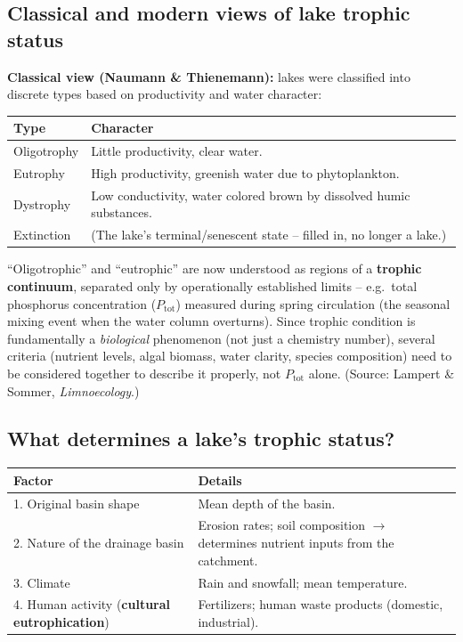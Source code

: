 \documentclass[11pt,a4paper]{article}
\begin{document}
\subsection{Classical and modern views of lake trophic status}
\textbf{Classical view (Naumann \& Thienemann):} lakes were classified into discrete types based on productivity and water character:
\begin{center}
\begin{tabularx}{\textwidth}{@{}l X@{}}
\toprule
\textbf{Type} & \textbf{Character} \\
\midrule
Oligotrophy & Little productivity, clear water. \\
Eutrophy & High productivity, greenish water due to phytoplankton. \\
Dystrophy & Low conductivity, water colored brown by dissolved humic substances. \\
Extinction & (The lake's terminal/senescent state -- filled in, no longer a lake.) \\
\bottomrule
\end{tabularx}
\end{center}

\begin{keybox}[title={Modern view: a continuum, not discrete boxes}]
``Oligotrophic'' and ``eutrophic'' are now understood as regions of a \textbf{trophic continuum}, separated only by operationally established limits -- e.g.\ total phosphorus concentration ($P_{\text{tot}}$) measured during spring circulation (the seasonal mixing event when the water column overturns). Since trophic condition is fundamentally a \emph{biological} phenomenon (not just a chemistry number), several criteria (nutrient levels, algal biomass, water clarity, species composition) need to be considered together to describe it properly, not $P_{\text{tot}}$ alone. (Source: Lampert \& Sommer, \textit{Limnoecology}.)
\end{keybox}

\subsection{What determines a lake's trophic status?}
\begin{center}
\begin{tabularx}{\textwidth}{@{}l X@{}}
\toprule
\textbf{Factor} & \textbf{Details} \\
\midrule
1. Original basin shape & Mean depth of the basin. \\
2. Nature of the drainage basin & Erosion rates; soil composition $\to$ determines nutrient inputs from the catchment. \\
3. Climate & Rain and snowfall; mean temperature. \\
4. Human activity (\textbf{cultural eutrophication}) & Fertilizers; human waste products (domestic, industrial). \\
\bottomrule
\end{tabularx}
\end{center}
\end{document}
